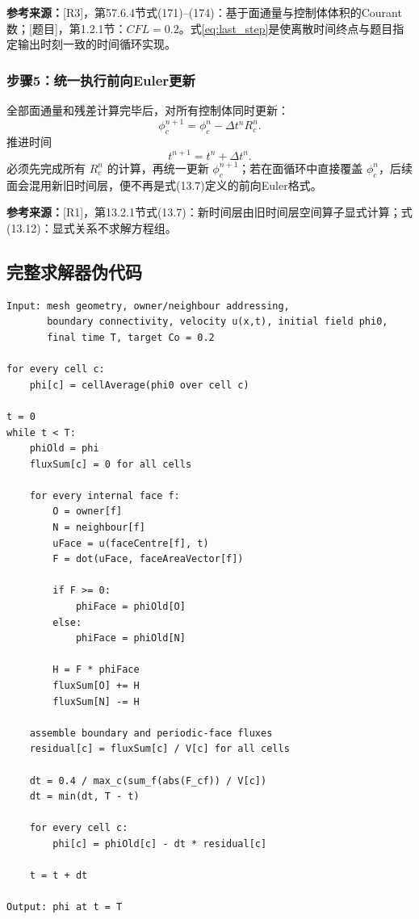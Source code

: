 \documentclass[UTF8,12pt,a4paper]{ctexart}
\numberwithin{equation}{section}
\newcommand{\Rone}{\textnormal{[R1]}}
\newcommand{\Rthree}{\textnormal{[R3]}}
\newcommand{\Task}{\textnormal{[题目]}}
\newcommand{\source}[1]{%
  \par\smallskip
  \noindent\colorbox{sourcebg}{%
    \parbox{0.955\linewidth}{\footnotesize\color{sourcegray}\textbf{参考来源：}#1}%
  }
  \par\smallskip
}
\begin{document}
\source{\Rthree，第57.6.4节式(171)--(174)：基于面通量与控制体体积的Courant数；\Task，第1.2.1节：$CFL=0.2$。式\eqref{eq:last_step}是使离散时间终点与题目指定输出时刻一致的时间循环实现。}

\subsubsection*{步骤5：统一执行前向Euler更新}

全部面通量和残差计算完毕后，对所有控制体同时更新：
\begin{equation}
  \boxed{
  \phi_c^{n+1}
  =\phi_c^n-\Delta t^n R_c^n
  }.
  \label{eq:solver_update}
\end{equation}
推进时间
\begin{equation}
  t^{n+1}=t^n+\Delta t^n.
  \label{eq:advance_time}
\end{equation}
必须先完成所有 $R_c^n$ 的计算，再统一更新 $\phi_c^{n+1}$；若在面循环中直接覆盖 $\phi_c^n$，后续面会混用新旧时间层，便不再是式(13.7)定义的前向Euler格式。

\source{\Rone，第13.2.1节式(13.7)：新时间层由旧时间层空间算子显式计算；式(13.12)：显式关系不求解方程组。}

\subsection{完整求解器伪代码}

\begin{lstlisting}[style=solver]
Input: mesh geometry, owner/neighbour addressing,
       boundary connectivity, velocity u(x,t), initial field phi0,
       final time T, target Co = 0.2

for every cell c:
    phi[c] = cellAverage(phi0 over cell c)

t = 0
while t < T:
    phiOld = phi
    fluxSum[c] = 0 for all cells

    for every internal face f:
        O = owner[f]
        N = neighbour[f]
        uFace = u(faceCentre[f], t)
        F = dot(uFace, faceAreaVector[f])

        if F >= 0:
            phiFace = phiOld[O]
        else:
            phiFace = phiOld[N]

        H = F * phiFace
        fluxSum[O] += H
        fluxSum[N] -= H

    assemble boundary and periodic-face fluxes
    residual[c] = fluxSum[c] / V[c] for all cells

    dt = 0.4 / max_c(sum_f(abs(F_cf)) / V[c])
    dt = min(dt, T - t)

    for every cell c:
        phi[c] = phiOld[c] - dt * residual[c]

    t = t + dt

Output: phi at t = T
\end{lstlisting}
\end{document}
